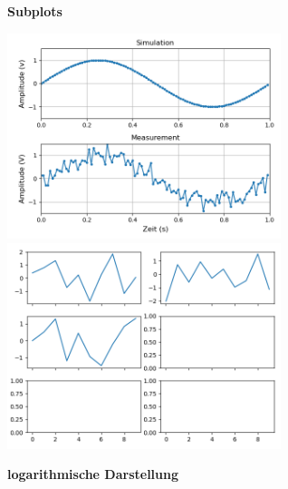 \newpage
\textbf{Subplots}
\\
\begin{minipage}[h]{10cm}
	
\end{minipage}
\begin{minipage}[h]{8cm}
	\includegraphics[width=8cm,align=t]{pics/Matplotlib/Subplots.png}
	\includegraphics[width=8cm,align=t]{pics/Matplotlib/MultSubplots.png}
\end{minipage}
\newpage
\textbf{logarithmische Darstellung}
\\
\begin{minipage}[h]{10cm}
	
\end{minipage}

